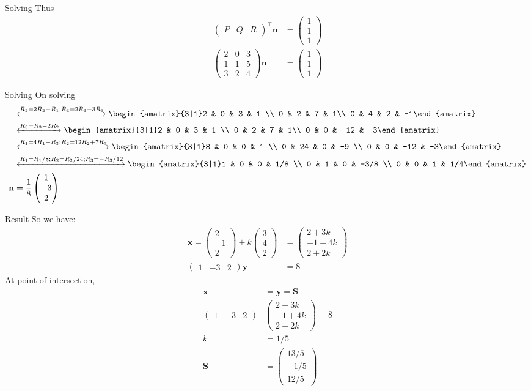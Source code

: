 \documentclass{beamer}
\theoremstyle{remark}
\newcommand{\myvec}[1]{\ensuremath{\begin{pmatrix}#1\end{pmatrix}}}
\newcommand{\augvec}[3]{\ensuremath{\begin{amatrix}{#1|#2}#3\end{amatrix}}}
\let\vec\mathbf
\numberwithin{equation}{section}
\begin{document}
\begin{frame}{Solving}
Thus
\begin{align}
 \myvec{P & Q & R}^\top\vec{n} &= \myvec{1\\1\\1} \\
  \myvec{2 & 0 & 3 \\ 1 & 1 & 5 \\ 3 & 2 & 4}\vec{n} &= \myvec{1\\1\\1}
\end{align}
\end{frame}
\begin{frame}{Solving}
On solving
\begin{align}
&\xleftrightarrow[]{R_2 = 2R_2-R_1; R_3 = 2R_3-3R_1} \augvec{3}{1}{2 & 0 & 3 & 1 \\ 0 & 2 & 7 & 1\\ 0 & 4 & 2 & -1} \\ &\xleftrightarrow[]{R_3=R_3-2R_2}
  \augvec{3}{1}{2 & 0 & 3 & 1 \\ 0 & 2 & 7 & 1\\ 0 & 0 & -12 & -3} \\ &\xleftrightarrow[]{R_1=4R_1+R_3; R_2= 12R_2+7R_3}
  \augvec{3}{1}{8 & 0 & 0 & 1 \\ 0 & 24 & 0 & -9 \\ 0 & 0 & -12 & -3} \\ &\xleftrightarrow[]{R_1 = R_1/8; R_2 = R_2/24; R_3 = -R_3/12}
  \augvec{3}{1}{1 & 0 & 0 & 1/8 \\ 0 & 1 & 0 & -3/8 \\ 0 & 0 & 1 & 1/4} \\
  \vec{n} &= \frac{1}{8}\myvec{1\\-3\\2}
\end{align}
\end{frame}
\begin{frame}{Result}
 So we have:
\begin{align}
 \vec{x} = \myvec{2\\-1\\2} +k\myvec{3\\4\\2} &= \myvec{2+3k \\ -1+4k \\ 2+2k} \\
 \myvec{1&-3&2}\vec{y}&=8
\end{align}
At point of intersection,
\begin{align}
 \vec{x}&=\vec{y}=\vec{S} \\
 \myvec{1&-3&2}&\myvec{2+3k\\-1+4k\\2+2k}=8 \\
 k &= 1/5 \\
 \vec{S} &= \myvec{13/5 \\ -1/5 \\ 12/5}
\end{align}
\end{frame}
\end{document}
